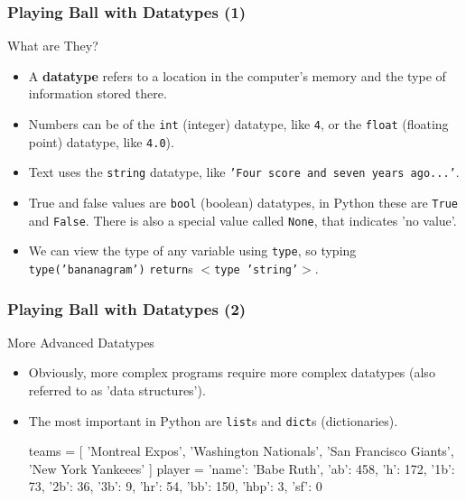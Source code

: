 \documentclass[10pt]{beamer}
\begin{document}
\begin{frame}
  \frametitle{Playing Ball with Datatypes (1)}
  \begin{block}{What are They?}
    \begin{itemize}
      \item A \textbf{datatype} refers to a location in the computer's memory and the type of information stored there.
      \item Numbers can be of the \texttt{int} (integer) datatype, like \texttt{4}, or the \texttt{float} (floating point) datatype, like \texttt{4.0}).
      \item Text uses the \texttt{string} datatype, like \texttt{'Four score and seven years ago...'}.
      \item True and false values are \texttt{bool} (boolean) datatypes, in Python these are \texttt{True} and \texttt{False}.
        There is also a special value called \texttt{None}, that indicates 'no value'.
      \item We can view the type of any variable using \texttt{type}, so typing \texttt{type('bananagram')}  \texttt{return}s \texttt{$<$type 'string'$>$}.
    \end{itemize}
  \end{block}
\end{frame}

\begin{frame}[fragile]
  \frametitle{Playing Ball with Datatypes (2)}
  \begin{block}{More Advanced Datatypes}
    \begin{itemize}
      \item Obviously, more complex programs require more complex datatypes (also referred to as 'data structures').
      \item The most important in Python are \texttt{list}s and \texttt{dict}s (dictionaries).
        \begin{pythoncode}
  teams = [
    'Montreal Expos', 'Washington Nationals',
    'San Francisco Giants', 'New York Yankeees'
  ]
  player = {
    'name': 'Babe Ruth', 'ab': 458, 'h': 172,
    '1b': 73, '2b': 36, '3b': 9, 'hr': 54,
    'bb': 150, 'hbp': 3, 'sf': 0
  }
        \end{pythoncode}
    \end{itemize}
  \end{block}
\end{frame}
\end{document}
